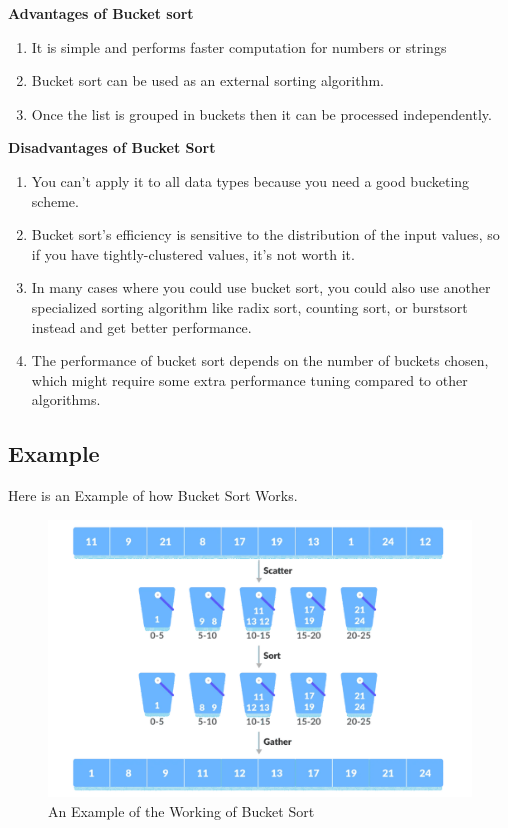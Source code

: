 \documentclass[11pt]{article}
\begin{document}
\noindent
\textbf{Advantages of Bucket sort}
\begin{enumerate}
	\item It is simple and performs faster computation for numbers or strings
	\item Bucket sort can be used as an external sorting algorithm.
	\item Once the list is grouped in buckets then it can be processed independently.
\end{enumerate}
\textbf{Disadvantages of Bucket Sort}
\begin{enumerate}
	\item You can't apply it to all data types because you need a good bucketing scheme.
	\item Bucket sort's efficiency is sensitive to the distribution of the input values, so if you have tightly-clustered values, it's not worth it.
	\item In many cases where you could use bucket sort, you could also use another specialized sorting algorithm like radix sort, counting sort, or burstsort instead and get better performance.
	\item The performance of bucket sort depends on the number of buckets chosen, which might require some extra performance tuning compared to other algorithms.
\end{enumerate}
\subsection{Example}
Here is an Example of how Bucket Sort Works.
\begin{figure}[H]
	\centering
	\includegraphics[scale=0.5]{bucket_workinge.png}
	\caption{An Example of the Working of Bucket Sort}
\end{figure}
\end{document}
